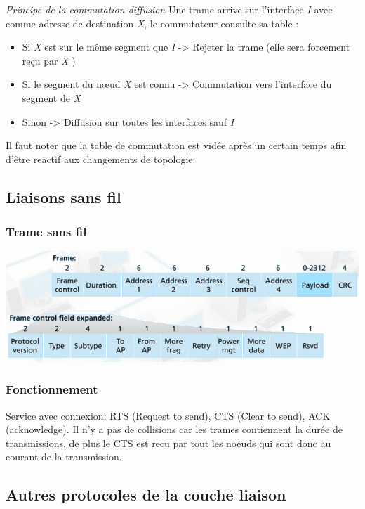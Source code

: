 \documentclass[a4paper, 12pt, french]{article}
\begin{document}
	\emph{Principe de la commutation-diffusion} Une trame arrive sur l'interface \emph{I} avec comme adresse de destination \emph{X}, le commutateur consulte sa table :
	\begin{itemize}
		\item Si \emph{X} est sur le même segment que \emph{I} -> Rejeter la trame (elle sera forcement reçu par \emph{X} )
		\item Si le segment du nœud \emph{X} est connu -> Commutation vers l'interface du segment de \emph{X}
		\item Sinon -> Diffusion sur toutes les interfaces sauf \emph{I} 
	\end{itemize}

	Il faut noter que la table de commutation est vidée après un certain temps afin d'être reactif aux changements de topologie.

	\subsection{Liaisons sans fil}

	\subsubsection{Trame sans fil}

	\includegraphics[width=13.8cm]{reseau_trame_sans_fils}

	\subsubsection{Fonctionnement}

	Service avec connexion: RTS (Request to send), CTS (Clear to send), ACK (acknowledge). Il n'y a pas de collisions car les trames contiennent la durée de transmissions, de plus le CTS est recu par tout les noeuds qui sont donc au courant de la transmission.

	\subsection{Autres protocoles de la couche liaison}
\end{document}
